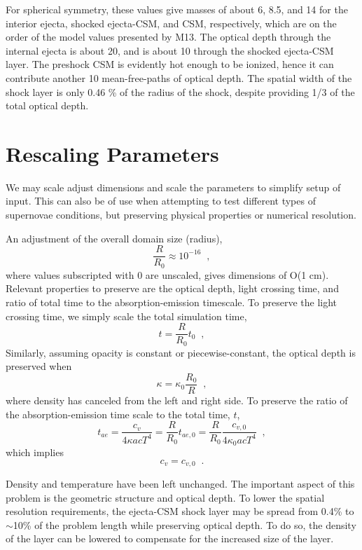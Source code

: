 \documentclass[11pt]{article}
\begin{document}
For spherical symmetry, these values give masses of about 6, 8.5, and 14 for the interior ejecta, shocked ejecta-CSM, and CSM, respectively, which are on the order of the model values presented by M13. The optical depth through the internal ejecta is about 20, and is about 10 through the shocked ejecta-CSM layer. The preshock CSM is evidently hot enough to be ionized, hence it can contribute another 10 mean-free-paths of optical depth. The spatial width of the shock layer is only 0.46 \% of the radius of the shock, despite providing 1/3 of the total optical depth.

\section{Rescaling Parameters}
\label{sec:rescaling}

We may scale adjust dimensions and scale the parameters to simplify setup of input. This can also be of use when attempting to test different types of supernovae conditions, but preserving physical properties or numerical resolution.

An adjustment of the overall domain size (radius),
\begin{equation}
  \frac{R}{R_0} \approx 10^{-16} \;\;,
\end{equation}
where values subscripted with $0$ are unscaled, gives dimensions of O(1 cm). Relevant properties to preserve are the optical depth, light crossing time, and ratio of total time to the absorption-emission timescale. To preserve the light crossing time, we simply scale the total simulation time,
\begin{equation}
  t = \frac{R}{R_0}t_0 \;\;,
\end{equation}
Similarly, assuming opacity is constant or piecewise-constant, the optical depth is preserved when
\begin{equation}
  \kappa = \kappa_0\frac{R_0}{R} \;\;,
\end{equation}
where density has canceled from the left and right side. To preserve the ratio of the absorption-emission time scale to the total time, $t$,
\begin{equation}
  t_{ae} = \frac{c_v}{4\kappa acT^4} = \frac{R}{R_0}t_{ae,0}
  = \frac{R}{R_0}\frac{c_{v,0}}{4\kappa_0 acT^4} \;\;,
\end{equation}
which implies
\begin{equation}
  c_v = c_{v,0} \;\;.
\end{equation}

Density and temperature have been left unchanged. The important aspect of this problem is the geometric structure and optical depth. To lower the spatial resolution requirements, the ejecta-CSM shock layer may be spread from 0.4\% to $\sim$10\% of the problem length while preserving optical depth. To do so, the density of the layer can be lowered to compensate for the increased size of the layer.
\end{document}
